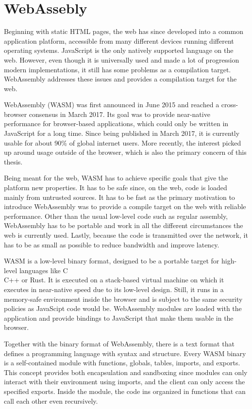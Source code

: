 \section{WebAssebly}
Beginning with static HTML pages, the web has since developed into a common application platform, accessible from many different devices running different operating systems. JavaScript is the only natively supported language on the web. However, even though it is universally used and made a lot of progression modern implementations, it still has some problems as a compilation target. WebAssembly addresses these issues and provides a compilation target for the web.

WebAssembly (WASM) was first announced in June 2015 and reached a cross-browser consensus in March 2017. Its goal was to provide near-native performance for browser-based applications, which could only be written in JavaScript for a long time. Since being published in March 2017, it is currently usable for about 90\% of global internet users. More recently, the interest picked up around usage outside of the browser, which is also the primary concern of this thesis.

Being meant for the web, WASM has to achieve specific goals that give the platform new properties. It has to be safe since, on the web, code is loaded mainly from untrusted sources. It has to be fast as the primary motivation to introduce WebAssembly was to provide a compile target on the web with reliable performance. Other than the usual low-level code such as regular assembly, WebAssembly has to be portable and work in all the different circumstances the web is currently used. Lastly, because the code is transmitted over the network, it has to be as small as possible to reduce bandwidth and improve latency.

WASM is a low-level binary format, designed to be a portable target for high-level languages like C\\C++ or Rust. It is executed on a stack-based virtual machine on which it executes in near-native speed due to its low-level design. Still, it runs in a memory-safe environment inside the browser and is subject to the same security policies as JavaScipt code would be. WebAssembly modules are loaded with the application and provide bindings to JavaScript that make them usable in the browser.

Together with the binary format of WebAssembly, there is a text format that defines a programming language with syntax and structure. Every WASM binary is a self-contained module with functions, globals, tables, imports, and exports. This concept provides both encapsulation and sandboxing since modules can only interact with their environment using imports, and the client can only access the specified exports. Inside the module, the code ins organized in functions that can call each other even recursively.
